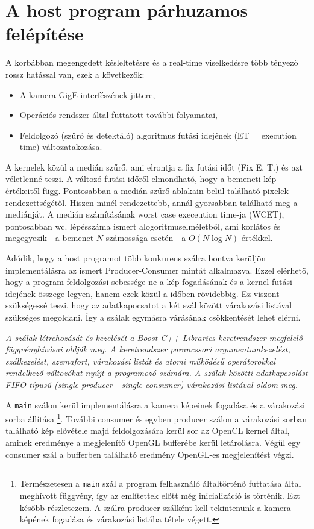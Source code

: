 \section{A host program párhuzamos felépítése} \label{sec:parallel}
	A korbábban megengedett késleltetésre és a real-time viselkedésre több tényező rossz hatással van, ezek a következők:
	\begin{itemize}[noitemsep]
	  \item A kamera GigE interfészének jittere,
	  \item Operációs rendszer által futtatott további folyamatai,
	  \item Feldolgozó (szűrő és detektáló) algoritmus futási idejének (ET = execution time) változatakozása. 
	\end{itemize}
	A kernelek közül a medián szűrő, ami elrontja a fix futási időt (Fix E. T.) és azt véletlenné teszi.
	A változó futási időről elmondható, hogy a bemeneti kép értékeitől függ. Pontosabban a medián szűrő ablakain belül található
	pixelek rendezettségétől. Hiszen minél rendezettebb, annál gyorsabban található meg a mediánját.
	A medián számításának worst case execeution time-ja (WCET), pontosabban wc. lépésszáma ismert alogoritmuselméletből, ami korlátos
	és megegyezik - a bemenet $N$ számossága esetén - a $O(N \log N)$  értékkel.
	
	Adódik, hogy a host programot több konkurens szálra bontva kerüljön implementálásra az ismert Producer-Consumer
	\cite{EWD:EWD329pub} mintát alkalmazva. Ezzel elérhető, hogy a program feldolgozási sebessége ne a kép fogadásának és a kernel
	futási idejének összege legyen, hanem ezek közül a időben rövidebbig.
	Ez viszont szükségessé teszi, hogy az adatkapocsatot a két szál között várakozási listával szükséges megoldani.
	Így a szálak egymásra várásának csökkentését lehet elérni.
	
	\cbstart \textit{
	A szálak létrehozását és kezelését a \textit{Boost C++ Libraries} \cite{boost} keretrendszer
	megfelelő függvényhívásai oldják meg. A keretrendszer parancssori argumentumkezelést, szálkezelést, szemafort, várakozási
	listát és atomi működésű operátorokkal rendelkező változókat nyújt a programozó számára.
	A szálak közötti adatkapcsolást FIFO típusú (single producer - single consumer) várakozási listával oldom meg.
	} \cbend
	
	A \texttt{main} szálon kerül implementálásra a kamera képeinek fogadása és a várakozási sorba állítása
	\footnote{Természetesen a \texttt{main} szál a program felhasználó általtörténő futtatása által meghívott függvény, így az
	említettek előtt még inicializáció is történik. Ezt később részletezem. A szálra producer szálként kell tekintenünk a kamera képének fogadása és
	várakozási listába tétele végett.}.
	További consumer és egyben producer szálon a várakozási sorban található kép elővétele majd feldolgozására kerül sor az
	OpenCL kernel által, aminek eredménye a megjelenítő OpenGL bufferébe kerül letárolásra.
	Végül egy consumer szál a bufferben található eredmény OpenGL-es megjelenítést végzi.
	
